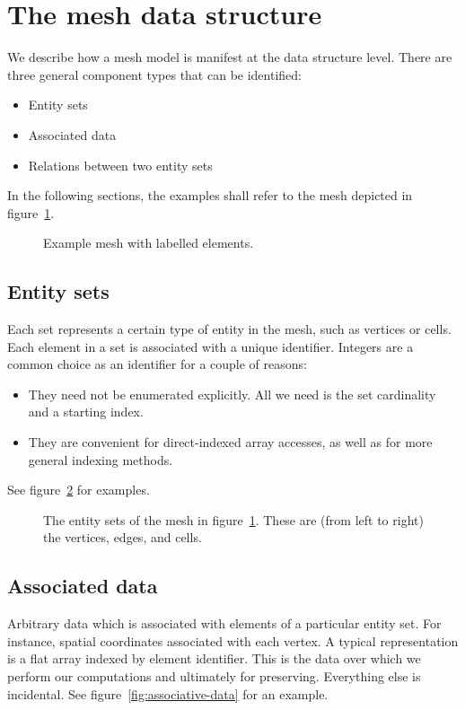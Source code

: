 \section{The mesh data structure}

We describe how a mesh model is manifest at the data structure level. There are three general component types that can be identified:
\begin{itemize}
\item Entity sets
\item Associated data
\item Relations between two entity sets
\end{itemize}

In the following sections, the examples shall refer to the mesh depicted in figure~\ref{fig:example-mesh}.

\begin{figure}
    
    \caption{Example mesh with labelled elements.}
    \label{fig:example-mesh}
\end{figure}


\subsection{Entity sets}
Each set represents a certain type of entity in the mesh, such as vertices or cells. Each element in a set is associated with a unique identifier. Integers are a common choice as an identifier for a couple of reasons:
\begin{itemize}
\item They need not be enumerated explicitly. All we need is the set cardinality and a starting index.
\item They are convenient for direct-indexed array accesses, as well as for more general indexing methods.
\end{itemize}

See figure~\ref{fig:entity-sets} for examples.

\begin{figure}
    
    \caption{The entity sets of the mesh in figure~\ref{fig:example-mesh}. These are (from left to right) the vertices, edges, and cells.}
    \label{fig:entity-sets}
\end{figure}


\subsection{Associated data}
Arbitrary data which is associated with elements of a particular entity set. For instance, spatial coordinates associated with each vertex. A typical representation is a flat array indexed by element identifier.
This is the data over which we perform our computations and ultimately for preserving. Everything else is incidental.
See figure~\ref{fig:associative-data} for an example.

